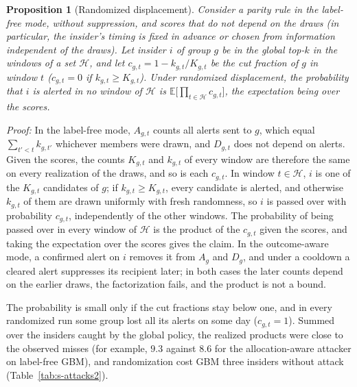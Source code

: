 \documentclass[10pt,onecolumn,letterpaper]{article}
\newenvironment{IEEEproof}[1][Proof]{\par\textit{#1:}}{\par}
\newtheorem{proposition}{Proposition}
\begin{document}
\begin{proposition}[Randomized displacement]
\label{prop:s-random}
Consider a parity rule in the label-free mode, without suppression, and scores that do not depend on the draws (in particular, the insider's timing is fixed in advance or chosen from information independent of the draws). Let insider $i$ of group $g$ be in the global top-$k$ in the windows of a set $\mathcal{H}$, and let $c_{g,t}=1-k_{g,t}/K_{g,t}$ be the cut fraction of $g$ in window $t$ ($c_{g,t}=0$ if $k_{g,t}\ge K_{g,t}$). Under randomized displacement, the probability that $i$ is alerted in no window of $\mathcal{H}$ is $\mathbb{E}\big[\prod_{t\in\mathcal{H}}c_{g,t}\big]$, the expectation being over the scores.
\end{proposition}
\begin{IEEEproof}
In the label-free mode, $A_{g,t}$ counts all alerts sent to $g$, which equal $\sum_{t'<t}k_{g,t'}$ whichever members were drawn, and $D_{g,t}$ does not depend on alerts. Given the scores, the counts $K_{g,t}$ and $k_{g,t}$ of every window are therefore the same on every realization of the draws, and so is each $c_{g,t}$. In window $t\in\mathcal{H}$, $i$ is one of the $K_{g,t}$ candidates of $g$; if $k_{g,t}\ge K_{g,t}$, every candidate is alerted, and otherwise $k_{g,t}$ of them are drawn uniformly with fresh randomness, so $i$ is passed over with probability $c_{g,t}$, independently of the other windows. The probability of being passed over in every window of $\mathcal{H}$ is the product of the $c_{g,t}$ given the scores, and taking the expectation over the scores gives the claim. In the outcome-aware mode, a confirmed alert on $i$ removes it from $A_g$ and $D_g$, and under a cooldown a cleared alert suppresses its recipient later; in both cases the later counts depend on the earlier draws, the factorization fails, and the product is not a bound.
\end{IEEEproof}

The probability is small only if the cut fractions stay below one, and in every randomized run some group lost all its alerts on some day ($c_{g,t}=1$). Summed over the insiders caught by the global policy, the realized products were close to the observed misses (for example, $9.3$ against $8.6$ for the allocation-aware attacker on label-free GBM), and randomization cost GBM three insiders without attack (Table~\ref{tab:s-attacks2}).
\end{document}
